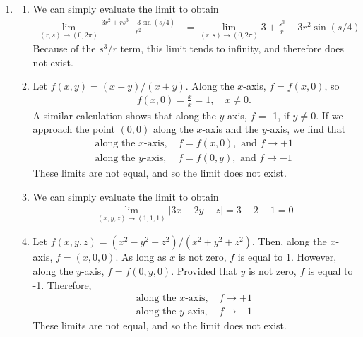 \begin{enumerate}
\item
\begin{enumerate}
\item We can simply evaluate the limit to obtain
\begin{align*}
\lim_{(r,s)\rightarrow(0,2\pi) } \frac{3r^2+rs^3-3\sin (s/4)}{r^2}
&= \lim_{(r,s)\rightarrow(0,2\pi) }3+\frac{s^3}{r}-3r^2\sin (s/4)
\end{align*}
Because of the $s^3/r$ term, this limit tends to infinity, and therefore does not exist.
\item Let $f(x,y) = (x-y)/(x+y)$. Along the $x$-axis, $f=f(x,0)$, so 
\begin{align*}
f(x,0) = \frac{x}{x} = 1, \quad x\ne 0.
\end{align*}
A similar calculation shows that along the $y$-axis, $f$ = -1, if $y\ne0$. If we approach the point $(0,0)$ along the $x$-axis and the $y$-axis, we find that 
\begin{align*}
\text{along the $x$-axis, } & f = f(x,0),\text{ and } f \rightarrow +1 \\
\text{along the $y$-axis, } & f = f(0,y),\text{ and } f \rightarrow -1 
\end{align*}
These limits are not equal, and so the limit does not exist. 
\item We can simply evaluate the limit to obtain 
\begin{align*}
  \lim_{(x,y,z)\rightarrow(1,1,1)} \big|3x - 2y - z \big| = 3 -2 -1 = 0
\end{align*}
\item  Let $f(x,y,z) = (x^2-y^2-z^2)/(x^2+y^2+z^2)$. Then, along the $x$-axis, $f=(x,0,0)$. As long as $x$ is not zero, $f$ is equal to 1. However, along the $y$-axis, $f=f(0,y,0)$. Provided that $y$ is not zero, $f$ is equal to -1. Therefore,
\begin{align*}
\text{along the $x$-axis, } & f \rightarrow +1 \\
\text{along the $y$-axis, } & f \rightarrow -1 
\end{align*}
These limits are not equal, and so the limit does not exist. 

\end{enumerate}
\end{enumerate}

